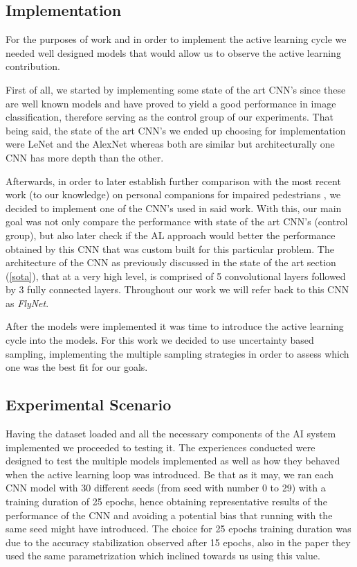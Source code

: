 \documentclass[journal, a4paper]{IEEEtran}
\begin{document}
\subsection{Implementation} \label{impl}


For the purposes of work and in order to implement the active learning cycle we needed
well designed models that would allow us to observe the active learning contribution.

First of all, we started by implementing some state of the art CNN's since these are
well known models and have proved to yield a good performance in image classification,
therefore serving as the control group of our experiments. That being said, 
the state of the art CNN's we ended up choosing for implementation were 
LeNet \cite{LeNet-5} and the AlexNet \cite{AlexNet} whereas both are similar but 
architecturally one CNN has more depth than the other.

Afterwards, in order to later establish further comparison with the most recent 
work (to our knowledge) on personal companions for impaired pedestrians \cite{tan2021flying},
we decided to implement one of the CNN's used in said work. With this, our main goal was not 
only compare the performance with state of the art CNN's (control group), but also later 
check if the AL approach would better the performance obtained by this CNN that was 
custom built for this particular problem. The architecture of the CNN as previously 
discussed in the state of the art section (\ref{sota}), that at a very high level, 
is comprised of 5 convolutional layers followed by 3 fully connected layers. 
Throughout our work we will refer back to this CNN as \textit{FlyNet}.

After the models were implemented it was time to introduce the active learning cycle
into the models. For this work we decided to use uncertainty based sampling, implementing
the multiple sampling strategies in order to assess which one was the best fit for our goals. 

\subsection{Experimental Scenario} \label{exp}

Having the dataset loaded and all the necessary components of the AI system implemented we
proceeded to testing it. The experiences conducted were designed to test the multiple models
implemented as well as how they behaved when the active learning loop was introduced. Be that
as it may, we ran each CNN model with 30 different seeds (from seed with number 0 to 29) with a
training duration of 25 epochs, hence obtaining representative results of the performance of the
CNN and avoiding a potential bias that running with the same seed might have introduced. The choice
for 25 epochs training duration was due to the accuracy stabilization observed after 15 epochs,
also in the \cite{tan2021flying} paper they used the same parametrization which inclined towards us 
using this value.
\end{document}
